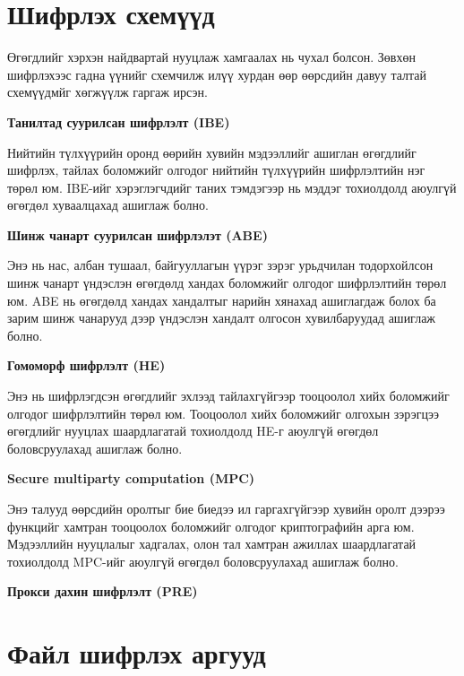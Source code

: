 \section{Шифрлэх схемүүд}
Өгөгдлийг хэрхэн найдвартай нууцлаж хамгаалах нь чухал болсон. Зөвхөн шифрлэхээс гадна үүнийг схемчилж илүү хурдан өөр өөрсдийн давуу талтай схемүүдмйг хөгжүүлж гаргаж ирсэн.

\textbf{Танилтад суурилсан шифрлэлт (IBE)} 

Нийтийн түлхүүрийн оронд өөрийн хувийн мэдээллийг ашиглан өгөгдлийг шифрлэх, тайлах боломжийг олгодог нийтийн түлхүүрийн шифрлэлтийн нэг төрөл юм. IBE-ийг хэрэглэгчдийг таних тэмдэгээр нь мэддэг тохиолдолд аюулгүй өгөгдөл хуваалцахад ашиглаж болно.

\textbf{Шинж чанарт суурилсан шифрлэлэт (ABE)}

Энэ нь нас, албан тушаал, байгууллагын үүрэг зэрэг урьдчилан тодорхойлсон шинж чанарт үндэслэн өгөгдөлд хандах боломжийг олгодог шифрлэлтийн төрөл юм. ABE нь өгөгдөлд хандах хандалтыг нарийн хянахад ашиглагдаж болох ба зарим шинж чанарууд дээр үндэслэн хандалт олгосон хувилбаруудад ашиглаж болно.

\textbf{Гомоморф шифрлэлт (HE)}

Энэ нь шифрлэгдсэн өгөгдлийг эхлээд тайлахгүйгээр тооцоолол хийх боломжийг олгодог шифрлэлтийн төрөл юм. Тооцоолол хийх боломжийг олгохын зэрэгцээ өгөгдлийг нууцлах шаардлагатай тохиолдолд HE-г аюулгүй өгөгдөл боловсруулахад ашиглаж болно.

\textbf{Secure multiparty computation (MPC)}

Энэ талууд өөрсдийн оролтыг бие биедээ ил гаргахгүйгээр хувийн оролт дээрээ функцийг хамтран тооцоолох боломжийг олгодог криптографийн арга юм. Мэдээллийн нууцлалыг хадгалах, олон тал хамтран ажиллах шаардлагатай тохиолдолд MPC-ийг аюулгүй өгөгдөл боловсруулахад ашиглаж болно.

\textbf{Прокси дахин шифрлэлт (PRE)}


\section{Файл шифрлэх аргууд}


